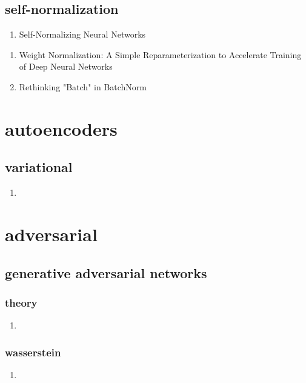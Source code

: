 \documentclass[acmlarge]{acmart}
\begin{document}
	\subsection{self-normalization}
	\begin{enumerate}
		\item Self-Normalizing Neural Networks \cite{Klambauer2017SelfNormalizingNN} 

	\end{enumerate}
\begin{enumerate}
	\item Weight Normalization: A Simple Reparameterization to Accelerate Training of Deep Neural Networks \cite{Salimans2016WeightNA} 

	\item Rethinking "Batch" in BatchNorm \cite{Wu2021RethinkingI} 

\end{enumerate}
\section{autoencoders}
	\subsection{variational}
	\begin{enumerate}
		\item
	\end{enumerate}
\begin{enumerate}
\end{enumerate}
\section{adversarial}
	\subsection{generative adversarial networks}
		\subsubsection{theory}
		\begin{enumerate}
			\item
		\end{enumerate}
		\subsubsection{wasserstein}
		\begin{enumerate}
			\item
		\end{enumerate}
\end{document}

